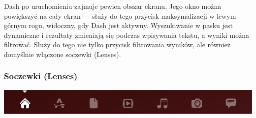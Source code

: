 Dash po uruchomieniu zajmuje pewien obszar ekranu. Jego okno można powiększyć na cały ekran --- służy do tego przycisk maksymalizacji w lewym górnym rogu, widoczny, gdy Dash jest aktywny. Wyszukiwanie w pasku jest dynamiczne i rezultaty zmieniają się podczas wpisywania tekstu, a wyniki można filtrować. Służy do tego nie tylko przycisk filtrowania wyników, ale również domyślnie włączone soczewki (Lenses).

\subsubsection{Soczewki (Lenses)}
\begin{center}
	\includegraphics[width=\linewidth]{images/unity_dash_lenses.png}
\end{center}

